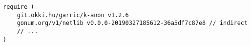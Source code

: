 \begin{lstlisting}[caption=The \texttt{go.mod} file,label=lst:go_mod,float,floatplacement=H]
require (
    git.okki.hu/garric/k-anon v1.2.6
    gonum.org/v1/netlib v0.0.0-20190327185612-36a5df7c87e8 // indirect
    // ...
)
\end{lstlisting}